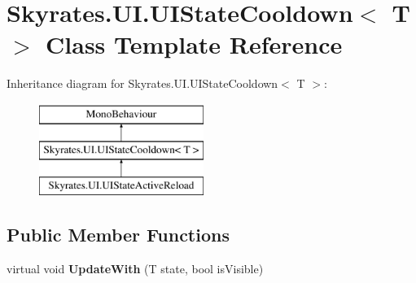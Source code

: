 \hypertarget{class_skyrates_1_1_u_i_1_1_u_i_state_cooldown_3_01_t_01_4}{\section{Skyrates.\-U\-I.\-U\-I\-State\-Cooldown$<$ T $>$ Class Template Reference}
\label{class_skyrates_1_1_u_i_1_1_u_i_state_cooldown_3_01_t_01_4}
}
Inheritance diagram for Skyrates.\-U\-I.\-U\-I\-State\-Cooldown$<$ T $>$\-:\begin{figure}[H]
\begin{center}
\leavevmode
\includegraphics[height=3.000000cm]{class_skyrates_1_1_u_i_1_1_u_i_state_cooldown_3_01_t_01_4}
\end{center}
\end{figure}
\subsection*{Public Member Functions}
\begin{DoxyCompactItemize}
\item 
\hypertarget{class_skyrates_1_1_u_i_1_1_u_i_state_cooldown_3_01_t_01_4_a2a18ed6d23daf2a21105b9cb04551002}{virtual void {\bfseries Update\-With} (T state, bool is\-Visible)}\label{class_skyrates_1_1_u_i_1_1_u_i_state_cooldown_3_01_t_01_4_a2a18ed6d23daf2a21105b9cb04551002}

\end{DoxyCompactItemize}
